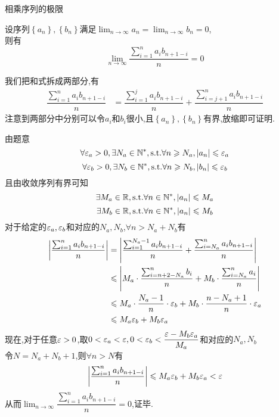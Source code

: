 \documentclass{ctexart}
\begin{document}
\pagestyle{empty}
\begin{center}
    \large 相乘序列的极限
\end{center}
\begin{formal}
    设序列$\left\{a_n\right\},\left\{b_n\right\}$满足$\displaystyle\lim_{n\to\infty}{a_n}=\lim_{n\to\infty}{b_n}=0$,\\
    则有$$\lim_{n\to\infty}{\dfrac{\sum_{i=1}^{n}{a_ib_{n+1-i}}}{n}}=0$$
\end{formal}
\begin{analyze}[Analysis.]
    我们把和式拆成两部分,有
    \begin{align*}
        \dfrac{\sum_{i=1}^{n}{a_ib_{n+1-i}}}{n}
        &= \dfrac{\sum_{i=1}^{j}{a_ib_{n+1-i}}}{n}+\dfrac{\sum_{i=j+1}^{n}{a_ib_{n+1-i}}}{n}
    \end{align*}
    注意到两部分中分别可以令$a_i$和$b_i$很小,且$\left\{a_n\right\},\left\{b_n\right\}$有界,放缩即可证明.
\end{analyze}
\begin{solution}[Proof.]
    由题意$$\forall \varepsilon_a>0,\exists N_a\in\mathbb{N}^*,\text{s.t.}\forall n\geqslant N_a,\left\lvert a_n\right\rvert\leqslant\varepsilon_a$$
    $$\forall \varepsilon_b>0,\exists N_b\in\mathbb{N}^*,\text{s.t.}\forall n\geqslant N_b,\left\lvert b_n\right\rvert\leqslant\varepsilon_b$$
    且由收敛序列有界可知$$\exists M_a\in\mathbb{R},\text{s.t.}\forall n\in\mathbb{N}^*,\left|a_n\right|\leqslant M_a$$
    $$\exists M_b\in\mathbb{R},\text{s.t.}\forall n\in\mathbb{N}^*,\left|a_n\right|\leqslant M_b$$
    对于给定的$\varepsilon_a,\varepsilon_b$和对应的$N_a,N_b$,$\forall n>N_a+N_b$有
    \begin{align*}
        \left|\dfrac{\sum_{i=1}^{n}{a_ib_{n+1-i}}}{n}\right|
        &= \left|\dfrac{\sum_{i=1}^{N_a-1}{a_ib_{n+1-i}}}{n}+\dfrac{\sum_{i=N_a}^{n}{a_ib_{n+1-i}}}{n}\right| \\
        &\leqslant \left|M_a\cdot\dfrac{\sum_{i=n+2-N_a}^{n}{b_i}}{n}+M_b\cdot\dfrac{\sum_{i=N_a}^{n}{a_i}}{n}\right| \\
        &\leqslant M_a\cdot\dfrac{N_a-1}{n}\cdot\varepsilon_b+M_b\cdot\dfrac{n-N_a+1}{n}\cdot\varepsilon_a \\
        &\leqslant M_a\varepsilon_b+M_b\varepsilon_a
    \end{align*}
    现在,对于任意$\varepsilon>0$,取$0<\varepsilon_a<\varepsilon,0<\varepsilon_b<\dfrac{\varepsilon-M_b\varepsilon_a}{M_a}$和对应的$N_a,N_b$ \\
    令$N=N_a+N_b+1$,则$\forall n>N$有$$\left|\dfrac{\sum_{i=1}^{n}{a_ib_{n+1-i}}}{n}\right|\leqslant M_a\varepsilon_b+M_b\varepsilon_a<\varepsilon$$
    从而$\displaystyle\lim_{n\to\infty}{\dfrac{\sum_{i=1}^{n}{a_ib_{n+1-i}}}{n}}=0$,证毕.
\end{solution}
\end{document}
